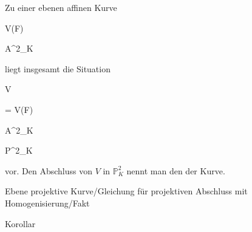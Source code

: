 Zu einer ebenen affinen Kurve


\mavergleichskette

{\vergleichskette

{ V(F)
}

{ \subset }{ {\mathbb A}^{2}_{K}
}

{  }{
}

{    }{
}

{   }{
}

}
{}{}{}
liegt insgesamt die Situation


\mavergleichskettedisp

{\vergleichskette

{V
}

{ =} { V(F)
}

{ \subset} { {\mathbb A}^{2}_{K}
}

{ \subset} { {\mathbb P}^{2}_{K}
}

{ } {
}

}
{}{}{}
vor. Den
 {} {}
Abschluss von $V$ in ${\mathbb P}^{2}_{K}$ nennt man den  {} der Kurve.



{Ebene projektive Kurve/Gleichung für projektiven Abschluss mit Homogenisierung/Fakt}

{Korollar}

{}

